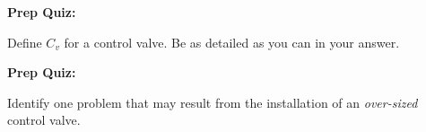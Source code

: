 \vfil \eject

\noindent
{\bf Prep Quiz:}

Define $C_v$ for a control valve.  Be as detailed as you can in your answer.







\vfil \eject

\noindent
{\bf Prep Quiz:}

Identify one problem that may result from the installation of an {\it over-sized} control valve.






